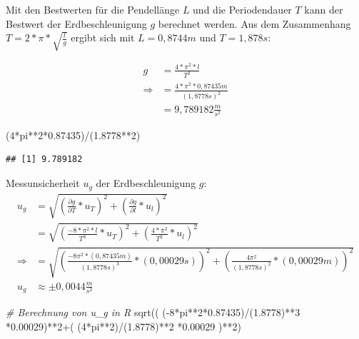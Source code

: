 \documentclass[
  9pt,
]{article}
\newenvironment{Shaded}{\begin{snugshade}}{\end{snugshade}}
\newcommand{\CommentTok}[1]{\textcolor[rgb]{0.56,0.35,0.01}{\textit{#1}}}
\newcommand{\DecValTok}[1]{\textcolor[rgb]{0.00,0.00,0.81}{#1}}
\newcommand{\FloatTok}[1]{\textcolor[rgb]{0.00,0.00,0.81}{#1}}
\newcommand{\FunctionTok}[1]{\textcolor[rgb]{0.00,0.00,0.00}{#1}}
\newcommand{\NormalTok}[1]{#1}
\newcommand{\SpecialCharTok}[1]{\textcolor[rgb]{0.00,0.00,0.00}{#1}}
\begin{document}
Mit den Bestwerten für die Pendellänge \(L\) und die Periodendauer \(T\)
kann der Bestwert der Erdbeschleunigung \(g\) berechnet werden. Aus dem
Zusammenhang \(T=2*\pi*\sqrt{\frac{l}{g}}\) ergibt sich mit
\(L = 0,8744m\) und \(T = 1,878s\):

\begin{equation*}
\begin{split}
g&=\frac{4*\pi^2*l}{T^2}\\
\Rightarrow &=\frac{4*\pi^2*0,87435m}{(1,8778s)^2}\\
 &= 9,789182 \frac{m}{s^2} 
\end{split}
\end{equation*}

\begin{Shaded}
\begin{Highlighting}[]
\NormalTok{(}\DecValTok{4}\SpecialCharTok{*}\NormalTok{pi}\SpecialCharTok{**}\DecValTok{2}\SpecialCharTok{*}\FloatTok{0.87435}\NormalTok{)}\SpecialCharTok{/}\NormalTok{(}\FloatTok{1.8778}\SpecialCharTok{**}\DecValTok{2}\NormalTok{)}
\end{Highlighting}
\end{Shaded}

\begin{verbatim}
## [1] 9.789182
\end{verbatim}

Messunsicherheit \(u_g\) der Erdbeschleunigung \(g\): \begin{equation*}
\begin{split}
u_g&=\sqrt{(\frac{\partial g}{\partial T}*u_T)^2+(\frac{\partial g}{\partial l}*u_l)^2}\\
   &=\sqrt{(\frac{-8*\pi^2*l}{T^3}*u_T)^2+(\frac{4*\pi^2}{T^2}*u_l)^2}\\
\Rightarrow &= \sqrt{(\frac{-8\pi^2*(0,87435m)}{(1,8778s)^3}*(0,00029s))^2+(\frac{4\pi^2}{(1,8778s)^2}*(0,00029m))^2}\\
u_g&\approx \pm 0,0044 \frac{m}{s^2}
\end{split}
\end{equation*}

\begin{Shaded}
\begin{Highlighting}[]
\CommentTok{\# Berechnung von u\_g in R}
\FunctionTok{sqrt}\NormalTok{(( (}\SpecialCharTok{{-}}\DecValTok{8}\SpecialCharTok{*}\NormalTok{pi}\SpecialCharTok{**}\DecValTok{2}\SpecialCharTok{*}\FloatTok{0.87435}\NormalTok{)}\SpecialCharTok{/}\NormalTok{(}\FloatTok{1.8778}\NormalTok{)}\SpecialCharTok{**}\DecValTok{3} \SpecialCharTok{*}\FloatTok{0.00029}\NormalTok{)}\SpecialCharTok{**}\DecValTok{2}\SpecialCharTok{+}\NormalTok{( (}\DecValTok{4}\SpecialCharTok{*}\NormalTok{pi}\SpecialCharTok{**}\DecValTok{2}\NormalTok{)}\SpecialCharTok{/}\NormalTok{(}\FloatTok{1.8778}\NormalTok{)}\SpecialCharTok{**}\DecValTok{2} \SpecialCharTok{*}\FloatTok{0.00029}\NormalTok{ )}\SpecialCharTok{**}\DecValTok{2}\NormalTok{)}
\end{Highlighting}
\end{Shaded}
\end{document}
